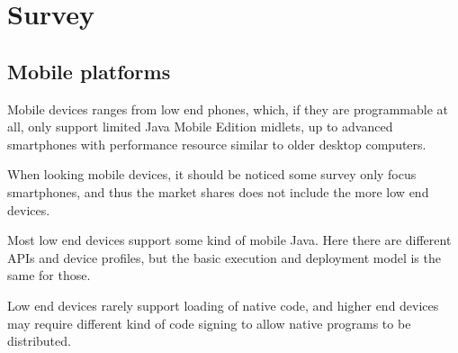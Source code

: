 \documentclass[11pt]{report}
\begin{document}
\chapter{Survey}
\label{survey}

\section{Mobile platforms}

Mobile devices ranges from low end phones, which, if they are programmable at all, only support limited Java Mobile Edition midlets, up to advanced smartphones with performance resource similar to older desktop computers.

When looking mobile devices, it should be noticed some survey \cite{smartphonesurvey} only focus smartphones, and thus the market shares does not include the more low end devices.

Most low end devices support some kind of mobile Java.
Here there are different APIs and device profiles, but the basic execution and deployment model is the same for those.

Low end devices rarely support loading of native code, and higher end devices may require different kind of code signing to allow native programs to be distributed.
\end{document}
